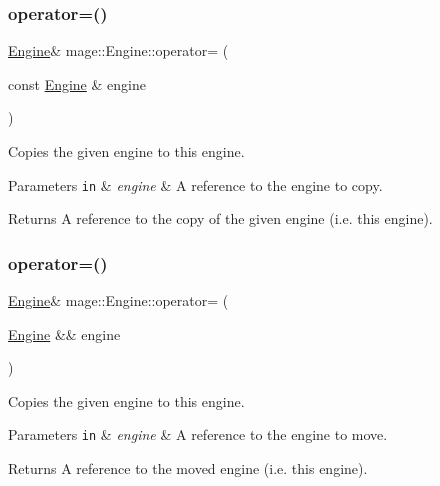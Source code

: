 \subsubsection{\texorpdfstring{operator=()}{operator=()}\hspace{0.1cm}{\footnotesize\ttfamily [1/2]}}
{\footnotesize\ttfamily \hyperlink{classmage_1_1_engine}{Engine}\& mage\+::\+Engine\+::operator= (\begin{DoxyParamCaption}\item[{const \hyperlink{classmage_1_1_engine}{Engine} \&}]{engine }\end{DoxyParamCaption})\hspace{0.3cm}{\ttfamily [delete]}}

Copies the given engine to this engine.


\begin{DoxyParams}[1]{Parameters}
\mbox{\tt in}  & {\em engine} & A reference to the engine to copy. \\
\hline
\end{DoxyParams}
\begin{DoxyReturn}{Returns}
A reference to the copy of the given engine (i.\+e. this engine). 
\end{DoxyReturn}
\hypertarget{classmage_1_1_engine_a22607a263e0be5e179cc0e4bf13b18f7}{}\label{classmage_1_1_engine_a22607a263e0be5e179cc0e4bf13b18f7} 
\subsubsection{\texorpdfstring{operator=()}{operator=()}\hspace{0.1cm}{\footnotesize\ttfamily [2/2]}}
{\footnotesize\ttfamily \hyperlink{classmage_1_1_engine}{Engine}\& mage\+::\+Engine\+::operator= (\begin{DoxyParamCaption}\item[{\hyperlink{classmage_1_1_engine}{Engine} \&\&}]{engine }\end{DoxyParamCaption})\hspace{0.3cm}{\ttfamily [delete]}}

Copies the given engine to this engine.


\begin{DoxyParams}[1]{Parameters}
\mbox{\tt in}  & {\em engine} & A reference to the engine to move. \\
\hline
\end{DoxyParams}
\begin{DoxyReturn}{Returns}
A reference to the moved engine (i.\+e. this engine). 
\end{DoxyReturn}
\hypertarget{classmage_1_1_engine_a0999f6eb6b09ad015103a46509b333b8}{}\label{classmage_1_1_engine_a0999f6eb6b09ad015103a46509b333b8} 
